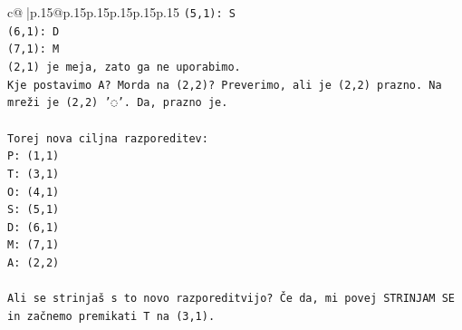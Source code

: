 \documentclass{article}
\begin{document}
{\begin{supertabular}{c@{$\;$}|p{.15\linewidth}@{}p{.15\linewidth}p{.15\linewidth}p{.15\linewidth}p{.15\linewidth}p{.15\linewidth}}
{{{\texttt{(5,1): S} \\
\texttt{(6,1): D} \\
\texttt{(7,1): M} \\
\texttt{(2,1) je meja, zato ga ne uporabimo.} \\
\texttt{Kje postavimo A? Morda na (2,2)? Preverimo, ali je (2,2) prazno. Na mreži je (2,2) '◌'. Da, prazno je.} \\
\\ 
\texttt{Torej nova ciljna razporeditev:} \\
\texttt{P: (1,1)} \\
\texttt{T: (3,1)} \\
\texttt{O: (4,1)} \\
\texttt{S: (5,1)} \\
\texttt{D: (6,1)} \\
\texttt{M: (7,1)} \\
\texttt{A: (2,2)} \\
\\ 
\texttt{Ali se strinjaš s to novo razporeditvijo? Če da, mi povej STRINJAM SE in začnemo premikati T na (3,1).} \\
            }
        }
    }
     \\ \\


\end{supertabular}}
\end{document}
